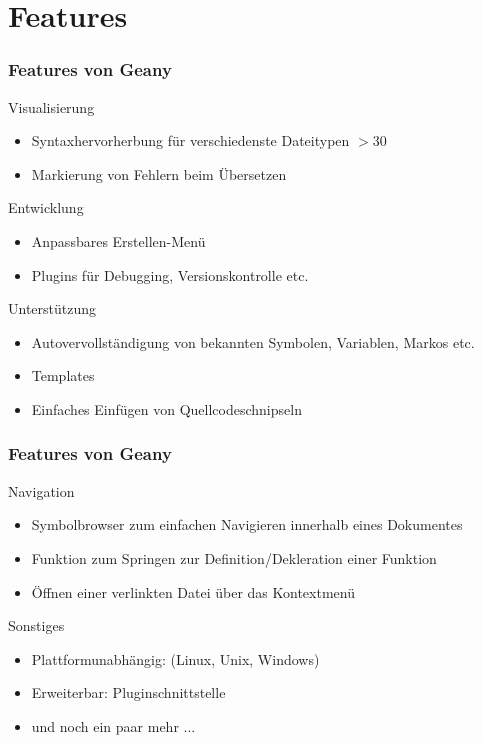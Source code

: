 \section{Features}
\begin{frame}[allowframebreak]
	\frametitle{Features von Geany}
	\begin{block}{Visualisierung}
		\begin{itemize}
			\item Syntaxhervorherbung für verschiedenste Dateitypen $>$30
			\item Markierung von Fehlern beim Übersetzen
		\end{itemize}
	\end{block}
	\begin{block}{Entwicklung}
		\begin{itemize}
			\item Anpassbares Erstellen-Menü
			\item Plugins für Debugging, Versionskontrolle etc.
		\end{itemize}
	\end{block}
	\begin{block}{Unterstützung}
		\begin{itemize}
			\item Autovervollständigung von bekannten Symbolen,
				  Variablen, Markos etc.
			\item Templates
			\item Einfaches Einfügen von Quellcodeschnipseln
		\end{itemize}
	\end{block}
\end{frame}
\begin{frame}[allowframebreak]
	\frametitle{Features von Geany}
	\begin{block}{Navigation}
		\begin{itemize}
			\item Symbolbrowser zum einfachen Navigieren innerhalb
			      eines Dokumentes
			\item Funktion zum Springen zur Definition/Dekleration
			      einer Funktion
			\item Öffnen einer verlinkten Datei über das Kontextmenü
		\end{itemize}
	\end{block}
	\begin{block}{Sonstiges}
		\begin{itemize}
			\item Plattformunabhängig: (Linux, Unix, Windows)
			\item Erweiterbar: Pluginschnittstelle
			\item und noch ein paar mehr ...
		\end{itemize}
	\end{block}
\end{frame}
